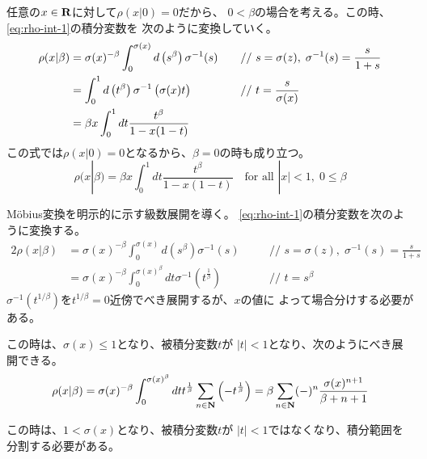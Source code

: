 \documentclass{jsarticle}
\begin{document}
\begin{description}\setlength{\itemsep}{-1mm} %
	\item[ベータ関数] 任意の$x\in\mathbf{R}$に対して$\rho(x|0)=0$だから、
	$0<\beta$の場合を考える。この時、\eqref{eq:rho-int-1}の積分変数を
	次のように変換していく。
	\begin{alignat*}{2}
		\rho(x|\beta) 
		&= \sigma(x)^{-\beta}\int_0^{\sigma(x)} d\mathinner{\left({s^\beta}\right)} \sigma^{-1}(s)
		&\quad&\text{// } s = \sigma(z),\;\sigma^{-1}(s) = \frac{s}{1 + s} \\
		&= \int_0^1 d\mathinner{\left({t^\beta}\right)} \sigma^{-1}\mathinner{\bigl({\sigma(x)t}\bigr)}
		&\quad&\text{// } t = \frac{s}{\sigma(x)} \\
		&= \beta x\int_0^1 dt \frac{t^\beta}{1 - x(1 - t)}
	\end{alignat*}
	この式では$\rho(x|0)=0$となるから、$\beta=0$の時も成り立つ。
	\begin{equation}\label{eq:rho-int-beta}
		\rho(x|\beta) = \beta x\int_0^1 dt \frac{t^\beta}{1 - x(1 - t)}
		\quad\text{for all } |x| < 1,\; 0 \le \beta
	\end{equation}
	\item[級数展開] M\"obius変換を明示的に示す級数展開を導く。
	\eqref{eq:rho-int-1}の積分変数を次のように変換する。
	\begin{alignat*}{2}
		\rho(x|\beta) 
		&= \sigma(x)^{-\beta}\int_0^{\sigma(x)} d(s^\beta)\sigma^{-1}(s)
		&\quad&\text{// } s = \sigma(z),\;\sigma^{-1}(s) = \frac{s}{1 + s} \\
		&= \sigma(x)^{-\beta}\int_0^{\sigma(x)^\beta} dt\sigma^{-1}(t^{\frac{1}{\beta}})
		&\quad&\text{// } t = s^\beta
	\end{alignat*}
	$\sigma^{-1}(t^{1/\beta})$を$t^{1/\beta}=0$近傍でべき展開するが、$x$の値に
	よって場合分けする必要がある。
	\begin{description}\setlength{\itemsep}{-1mm} %
		\item[$x\le 1/2$の時] この時は、$\sigma(x)\le 1$となり、被積分変数$t$が
		$|t|<1$となり、次のようにべき展開できる。
		\begin{equation*}
			\rho(x|\beta) = \sigma(x)^{-\beta}\int_0^{\sigma(x)^\beta} dt 
				t^{\frac{1}{\beta}}\sum_{n\in\mathbf{N}} \mathinner{\left({- t^{\frac{1}{\beta}}}\right)}
			= \beta \sum_{n\in\mathbf{N}} (-)^n\frac{\sigma(x)^{n + 1}}{\beta + n + 1}
		\end{equation*}
		\item[$1/2< x$の時] この時は、$1<\sigma(x)$となり、被積分変数$t$が
		$|t|<1$ではなくなり、積分範囲を分割する必要がある。
		\begin{equation*}\begin{split}

\end{split}
\end{equation*}
\end{description}
\end{description}
\end{document}
